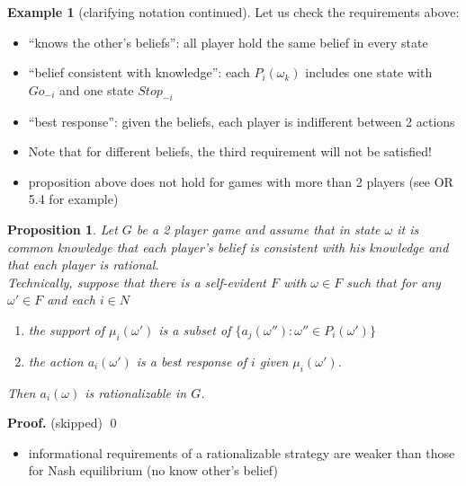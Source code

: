 \documentclass{beamer}    %
\theoremstyle{plain}
\newtheorem{prop}{Proposition}
\theoremstyle{definition}
\newtheorem{ex}{Example}
\begin{document}
{\begin{ex}[clarifying notation continued]
Let us check the requirements above:
\begin{itemize}
\item ``knows the other's beliefs'': all player hold the same belief in
  every state
\item ``belief consistent with knowledge'': each $P_i(\omega_k)$ includes one state with  $Go_{-i}$ and one state $Stop_{-i}$
\item  ``best response'': given the beliefs, each player is indifferent between 2 actions %
\item  Note that for different beliefs, the third requirement will not be
  satisfied!
\end{itemize}

\end{ex}
\begin{itemize}
\item proposition above does not hold for games with more than 2 players (see OR 5.4 for example)
\end{itemize}

\framebreak

\begin{prop}
  Let $G$ be a 2 player game and assume that in state $\omega$ it is common knowledge that each player's belief is consistent with his knowledge and that each player is rational.\\ Technically, suppose that there is a self-evident $F$ with $\omega\in F$ such that for any $\omega'\in F$ and each $i\in N$
  \begin{enumerate}
  \item the support of $\mu_i(\omega')$ is a subset of $\{a_j(\omega''): \omega''\in P_i(\omega')\} $
  \item the action $a_i(\omega')$ is a best response of $i$ given $\mu_i(\omega')$.
  \end{enumerate}
Then $a_i(\omega)$ is rationalizable in $G$.
\end{prop}
\textbf{Proof. }(skipped)%
\qed
\begin{itemize}
\item informational requirements of a rationalizable strategy are weaker
  than those for Nash equilibrium (no know other's belief)
\end{itemize}

}
\end{document}
